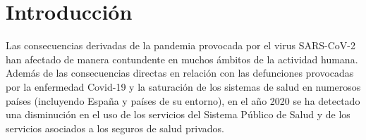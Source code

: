 \documentclass[12pt,twoside]{article} %
\begin{document}
\tableofcontents\bueceemptypage
\listoffigures\bueceemptypage
\listoftables\bueceemptypage

\buecereportheaders

\setcounter{page}{1}

\section{Introducción}  %
Las consecuencias derivadas de la pandemia provocada por el virus SARS-CoV-2 han afectado de manera contundente en muchos ámbitos de la actividad humana. Además de las consecuencias directas en relación con las defunciones provocadas por la enfermedad Covid-19 y la saturación de los sistemas de salud en numerosos países (incluyendo España y países de su entorno), en el año 2020 se ha detectado una disminución en el uso de los servicios del Sistema Público de Salud y de los servicios asociados a los seguros de salud privados. 
\end{document}
